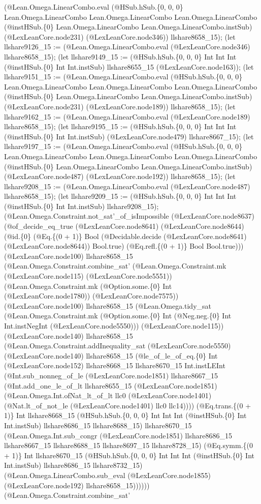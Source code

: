 \documentclass[11pt]{article}
\begin{document}
(@Lean.Omega.LinearCombo.eval (@HSub.hSub.\{0, 0, 0\} Lean.Omega.LinearCombo Lean.Omega.LinearCombo Lean.Omega.LinearCombo (@instHSub.\{0\} Lean.Omega.LinearCombo Lean.Omega.LinearCombo.instSub) (@LexLeanCore.node231) (@LexLeanCore.node346)) llshare8658\_15); (let llshare9126\_15 := (@Lean.Omega.LinearCombo.eval (@LexLeanCore.node346) llshare8658\_15); (let llshare9149\_15 := (@HSub.hSub.\{0, 0, 0\} Int Int Int (@instHSub.\{0\} Int Int.instSub) llshare8655\_15 (@LexLeanCore.node163)); (let llshare9151\_15 := (@Lean.Omega.LinearCombo.eval (@HSub.hSub.\{0, 0, 0\} Lean.Omega.LinearCombo Lean.Omega.LinearCombo Lean.Omega.LinearCombo (@instHSub.\{0\} Lean.Omega.LinearCombo Lean.Omega.LinearCombo.instSub) (@LexLeanCore.node231) (@LexLeanCore.node189)) llshare8658\_15); (let llshare9162\_15 := (@Lean.Omega.LinearCombo.eval (@LexLeanCore.node189) llshare8658\_15); (let llshare9195\_15 := (@HSub.hSub.\{0, 0, 0\} Int Int Int (@instHSub.\{0\} Int Int.instSub) (@LexLeanCore.node479) llshare8667\_15); (let llshare9197\_15 := (@Lean.Omega.LinearCombo.eval (@HSub.hSub.\{0, 0, 0\} Lean.Omega.LinearCombo Lean.Omega.LinearCombo Lean.Omega.LinearCombo (@instHSub.\{0\} Lean.Omega.LinearCombo Lean.Omega.LinearCombo.instSub) (@LexLeanCore.node487) (@LexLeanCore.node192)) llshare8658\_15); (let llshare9208\_15 := (@Lean.Omega.LinearCombo.eval (@LexLeanCore.node487) llshare8658\_15); (let llshare9209\_15 := (@HSub.hSub.\{0, 0, 0\} Int Int Int (@instHSub.\{0\} Int Int.instSub) llshare9208\_15); (@Lean.Omega.Constraint.not\_sat'\_of\_isImpossible (@LexLeanCore.node8637) (@of\_decide\_eq\_true (@LexLeanCore.node8641) (@LexLeanCore.node8644) (@id.\{0\} (@Eq.\{(0 + 1)\} Bool (@Decidable.decide (@LexLeanCore.node8641) (@LexLeanCore.node8644)) Bool.true) (@Eq.refl.\{(0 + 1)\} Bool Bool.true))) (@LexLeanCore.node100) llshare8658\_15 (@Lean.Omega.Constraint.combine\_sat' (@Lean.Omega.Constraint.mk (@LexLeanCore.node115) (@LexLeanCore.node5551)) (@Lean.Omega.Constraint.mk (@Option.some.\{0\} Int (@LexLeanCore.node1780)) (@LexLeanCore.node7575)) (@LexLeanCore.node100) llshare8658\_15 (@Lean.Omega.tidy\_sat (@Lean.Omega.Constraint.mk (@Option.some.\{0\} Int (@Neg.neg.\{0\} Int Int.instNegInt (@LexLeanCore.node5550))) (@LexLeanCore.node115)) (@LexLeanCore.node140) llshare8658\_15 (@Lean.Omega.Constraint.addInequality\_sat (@LexLeanCore.node5550) (@LexLeanCore.node140) llshare8658\_15 (@le\_of\_le\_of\_eq.\{0\} Int (@LexLeanCore.node152) llshare8668\_15 llshare8670\_15 Int.instLEInt (@Int.sub\_nonneg\_of\_le (@LexLeanCore.node1851) llshare8667\_15 (@Int.add\_one\_le\_of\_lt llshare8655\_15 (@LexLeanCore.node1851) (@Lean.Omega.Int.ofNat\_lt\_of\_lt llc0 (@LexLeanCore.node1401) (@Nat.lt\_of\_not\_le (@LexLeanCore.node1401) llc0 llc14)))) (@Eq.trans.\{(0 + 1)\} Int llshare8668\_15 (@HSub.hSub.\{0, 0, 0\} Int Int Int (@instHSub.\{0\} Int Int.instSub) llshare8686\_15 llshare8688\_15) llshare8670\_15 (@Lean.Omega.Int.sub\_congr (@LexLeanCore.node1851) llshare8686\_15 llshare8667\_15 llshare8688\_15 llshare8697\_15 llshare8728\_15) (@Eq.symm.\{(0 + 1)\} Int llshare8670\_15 (@HSub.hSub.\{0, 0, 0\} Int Int Int (@instHSub.\{0\} Int Int.instSub) llshare8686\_15 llshare8732\_15) (@Lean.Omega.LinearCombo.sub\_eval (@LexLeanCore.node1855) (@LexLeanCore.node192) llshare8658\_15)))))) (@Lean.Omega.Constraint.combine\_sat' 
\end{document}
